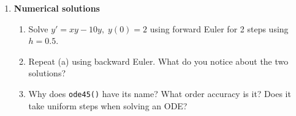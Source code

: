\documentclass[letterpaper, fontsize=12pt]{scrartcl} %
\numberwithin{equation}{section} %
\numberwithin{figure}{section} %
\numberwithin{table}{section} %
\begin{document}
\begin{enumerate}
\begin{enumerate}[label = (\alph*)]
\end{enumerate}

\clearpage
\item \textbf{Numerical solutions}
\begin{enumerate}[label = (\alph*)]
\item Solve $y' = xy - 10y, \; y(0) = 2$ using forward Euler for 2 steps using $ h = 0.5$. 

\item Repeat (a) using backward Euler. What do you notice about the two solutions?
%

\item Why does \texttt{ode45()} have its name? What order accuracy is it? Does it take uniform steps when solving an ODE? 



\end{enumerate}
\end{enumerate}
\end{document}

